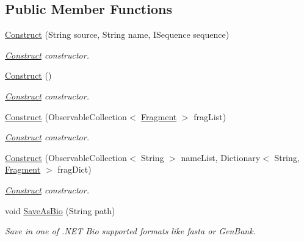 \subsection*{Public Member Functions}
\begin{DoxyCompactItemize}
\item 
\hyperlink{class_mufasa_1_1_back_end_1_1_designer_1_1_construct_a98b5641a78f51fb9a3b8646d58c49896}{Construct} (String source, String name, I\+Sequence sequence)
\begin{DoxyCompactList}\small\item\em \hyperlink{class_mufasa_1_1_back_end_1_1_designer_1_1_construct}{Construct} constructor. \end{DoxyCompactList}\item 
\hyperlink{class_mufasa_1_1_back_end_1_1_designer_1_1_construct_a0197d6814881266d381a78eefb510257}{Construct} ()
\begin{DoxyCompactList}\small\item\em \hyperlink{class_mufasa_1_1_back_end_1_1_designer_1_1_construct}{Construct} constructor. \end{DoxyCompactList}\item 
\hyperlink{class_mufasa_1_1_back_end_1_1_designer_1_1_construct_a9e6c0da2b6fe157cb71011dfb80591c5}{Construct} (Observable\+Collection$<$ \hyperlink{class_mufasa_1_1_back_end_1_1_designer_1_1_fragment}{Fragment} $>$ frag\+List)
\begin{DoxyCompactList}\small\item\em \hyperlink{class_mufasa_1_1_back_end_1_1_designer_1_1_construct}{Construct} constructor. \end{DoxyCompactList}\item 
\hyperlink{class_mufasa_1_1_back_end_1_1_designer_1_1_construct_a4db1a8353ece3f2c75bbca01973eaf9e}{Construct} (Observable\+Collection$<$ String $>$ name\+List, Dictionary$<$ String, \hyperlink{class_mufasa_1_1_back_end_1_1_designer_1_1_fragment}{Fragment} $>$ frag\+Dict)
\begin{DoxyCompactList}\small\item\em \hyperlink{class_mufasa_1_1_back_end_1_1_designer_1_1_construct}{Construct} constructor. \end{DoxyCompactList}\item 
void \hyperlink{class_mufasa_1_1_back_end_1_1_designer_1_1_construct_aa24e1e0f2918c562b64cec51813054f2}{Save\+As\+Bio} (String path)
\begin{DoxyCompactList}\small\item\em Save in one of .N\+E\+T Bio supported formats like fasta or Gen\+Bank. \end{DoxyCompactList}\end{DoxyCompactItemize}

